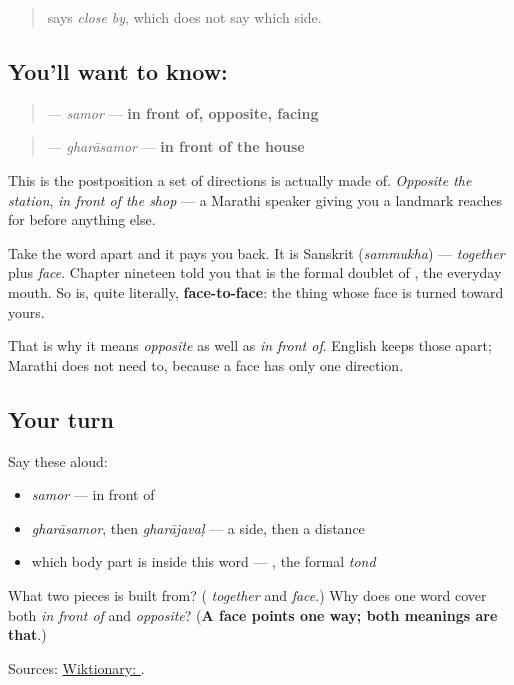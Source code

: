 \begin{quote}
\textbf{} says \emph{close by}, which does not say which side.
\end{quote}

\subsection*{You'll want to know: }
\begin{quote}
\textbf{} — \emph{samor} — \textbf{in front of, opposite, facing}
\end{quote}

\begin{quote}
\textbf{} — \emph{gharāsamor} — \textbf{in front of the house}
\end{quote}

This is the postposition a set of directions is actually made of. \emph{Opposite the station}, \emph{in front of the shop} — a Marathi speaker giving you a landmark reaches for \textbf{} before anything else.

Take the word apart and it pays you back. It is Sanskrit \textbf{} (\emph{sammukha}) — \textbf{} \emph{together} plus \textbf{} \emph{face}. Chapter nineteen told you that \textbf{} is the formal doublet of \textbf{}, the everyday mouth. So \textbf{} is, quite literally, \textbf{face-to-face}: the thing whose face is turned toward yours.

That is why it means \emph{opposite} as well as \emph{in front of}. English keeps those apart; Marathi does not need to, because a face has only one direction.

\subsection*{Your turn}
Say these aloud:

\begin{itemize}
\raggedright
  \item \emph{samor} — in front of
  \item \emph{gharāsamor}, then \emph{gharājavaḷ} — a side, then a distance
  \item which body part is inside this word — \emph{\textbf{}}, the formal \emph{tond}
\end{itemize}

\begin{tcolorbox}[breakable,colback=teal!4,colframe=teal!35!black,title={Before you move on}]
What two pieces is \textbf{} built from? (\emph{\textbf{}} \emph{together} and \emph{\textbf{}} \emph{face}.) Why does one word cover both \emph{in front of} and \emph{opposite}? (\textbf{A face points one way; both meanings are that}.)

Sources: \href{https://en.wiktionary.org/wiki/\%E0\%A4\%B8\%E0\%A4\%AE\%E0\%A5\%8B\%E0\%A4\%B0}{Wiktionary: }.
\end{tcolorbox}
